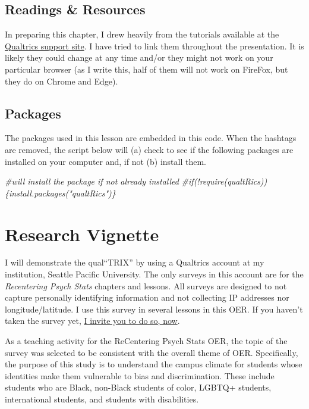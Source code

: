 \documentclass[
  english,
]{book}
\newenvironment{Shaded}{\begin{snugshade}}{\end{snugshade}}
\newcommand{\CommentTok}[1]{\textcolor[rgb]{0.56,0.35,0.01}{\textit{#1}}}
\begin{document}
\hypertarget{readings-resources-1}{%
\subsection{Readings \& Resources}\label{readings-resources-1}}

In preparing this chapter, I drew heavily from the tutorials available at the \href{https://www.qualtrics.com/support/}{Qualtrics support site}. I have tried to link them throughout the presentation. It is likely they could change at any time and/or they might not work on your particular browser (as I write this, half of them will not work on FireFox, but they do on Chrome and Edge).

\hypertarget{packages-1}{%
\subsection{Packages}\label{packages-1}}

The packages used in this lesson are embedded in this code. When the hashtags are removed, the script below will (a) check to see if the following packages are installed on your computer and, if not (b) install them.

\begin{Shaded}
\begin{Highlighting}[]
\CommentTok{\#will install the package if not already installed}
\CommentTok{\#if(!require(qualtRics))\{install.packages("qualtRics")\}}
\end{Highlighting}
\end{Shaded}

\hypertarget{research-vignette}{%
\section{Research Vignette}\label{research-vignette}}

I will demonstrate the qual``TRIX'' by using a Qualtrics account at my institution, Seattle Pacific University. The only surveys in this account are for the \emph{Recentering Psych Stats} chapters and lessons. All surveys are designed to not capture personally identifying information and not collecting IP addresses nor longitude/latitude. I use this survey in several lessons in this OER. If you haven't taken the survey yet, \href{https://spupsych.az1.qualtrics.com/jfe/form/SV_b2cClqAlLGQ6nLU}{I invite you to do so, now}.

As a teaching activity for the ReCentering Psych Stats OER, the topic of the survey was selected to be consistent with the overall theme of OER. Specifically, the purpose of this study is to understand the campus climate for students whose identities make them vulnerable to bias and discrimination. These include students who are Black, non-Black students of color, LGBTQ+ students, international students, and students with disabilities.
\end{document}
